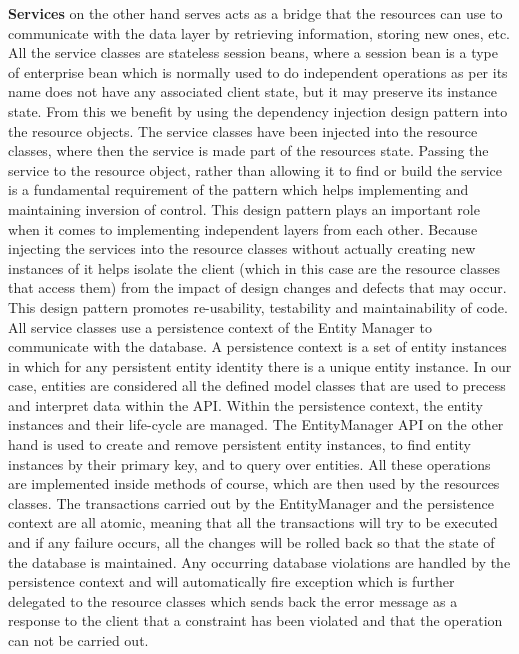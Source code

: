 \textbf{Services} on the other hand serves acts as a bridge that the resources can use to communicate with the data layer by retrieving information, storing new ones, etc. All the service classes are stateless session beans, where a session bean is a type of enterprise bean which is normally used to do independent operations as per its name does not have any associated client state, but it may preserve its instance state. From this we benefit by using the dependency injection \cite{DependencyInjectionRef} design pattern into the resource objects. The service classes have been injected into the resource classes, where then the service is made part of the resources state. Passing the service to the resource object, rather than allowing it to find or build the service is a fundamental requirement of the pattern which helps implementing and maintaining inversion of control. This design pattern plays an important role when it comes to implementing independent layers from each other. Because injecting the services into the resource classes without actually creating new instances of it helps isolate the client (which in this case are the resource classes that access them) from the impact of design changes and defects that may occur. This design pattern promotes re-usability, testability and maintainability of code.
All service classes use a persistence context of the Entity Manager to communicate with the database. A persistence context is a set of entity instances in which for any persistent entity identity there is a unique entity instance. In our case, entities are considered all the defined model classes that are used to precess and interpret data within the API. Within the persistence context, the entity instances and their life-cycle are managed. The EntityManager API on the other hand is used to create and remove persistent entity instances, to find entity instances by their primary key, and to query over entities. All these operations are implemented inside methods of course, which are then used by the resources classes. The transactions carried out by the EntityManager and the persistence context are all atomic, meaning that all the transactions will try to be executed and if any failure occurs, all the changes will be rolled back so that the state of the database is maintained. Any occurring database violations are handled by the persistence context and will automatically fire exception which is further delegated to the resource classes which sends back the error message as a response to the client that a constraint has been violated and that the operation can not be carried out.

